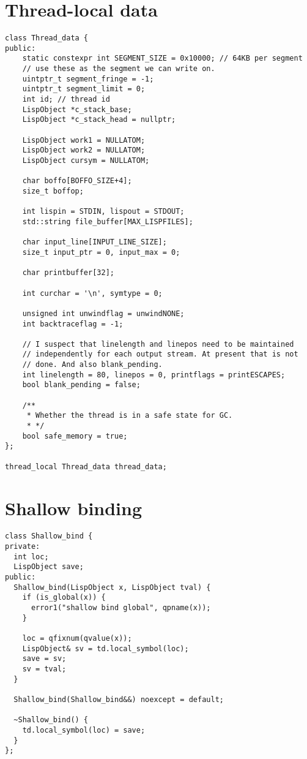 \section{Thread-local data}
\label{sec:thread-local-code}

\begin{code}
\begin{verbatim}
class Thread_data {
public:
    static constexpr int SEGMENT_SIZE = 0x10000; // 64KB per segment
    // use these as the segment we can write on.
    uintptr_t segment_fringe = -1;
    uintptr_t segment_limit = 0;
    int id; // thread id
    LispObject *c_stack_base;
    LispObject *c_stack_head = nullptr;

    LispObject work1 = NULLATOM;
    LispObject work2 = NULLATOM;
    LispObject cursym = NULLATOM;

    char boffo[BOFFO_SIZE+4];
    size_t boffop;

    int lispin = STDIN, lispout = STDOUT;
    std::string file_buffer[MAX_LISPFILES];

    char input_line[INPUT_LINE_SIZE];
    size_t input_ptr = 0, input_max = 0;

    char printbuffer[32];

    int curchar = '\n', symtype = 0;

    unsigned int unwindflag = unwindNONE;
    int backtraceflag = -1;

    // I suspect that linelength and linepos need to be maintained
    // independently for each output stream. At present that is not
    // done. And also blank_pending.
    int linelength = 80, linepos = 0, printflags = printESCAPES;
    bool blank_pending = false;

    /**
     * Whether the thread is in a safe state for GC.
     * */
    bool safe_memory = true;
};

thread_local Thread_data thread_data;
\end{verbatim}
\end{code}

\section{Shallow binding}
\label{sec:shallowbind-code}

\begin{code}
\begin{verbatim}
class Shallow_bind {
private:
  int loc;
  LispObject save;
public:
  Shallow_bind(LispObject x, LispObject tval) {
    if (is_global(x)) {
      error1("shallow bind global", qpname(x));
    }

    loc = qfixnum(qvalue(x));
    LispObject& sv = td.local_symbol(loc);
    save = sv;
    sv = tval;
  }

  Shallow_bind(Shallow_bind&&) noexcept = default;

  ~Shallow_bind() {
    td.local_symbol(loc) = save;
  }
};
\end{verbatim}
\end{code}

